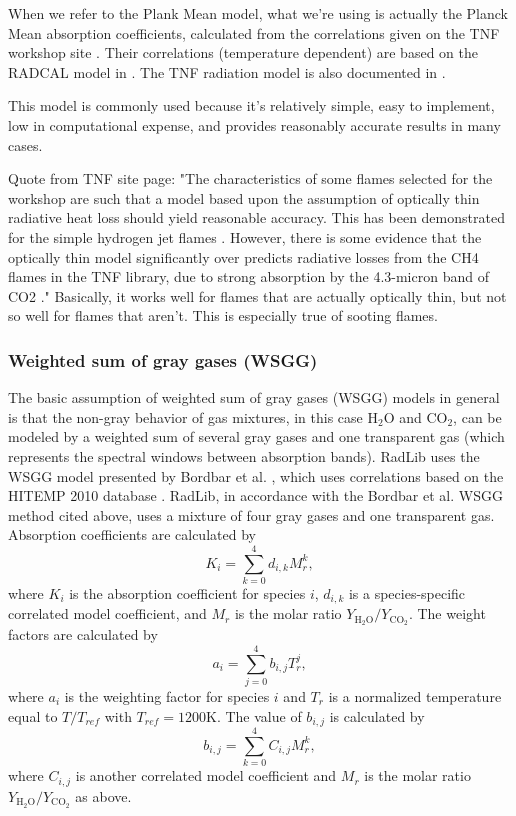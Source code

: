 \documentclass[preprint,12pt, a4paper]{elsarticle}
\begin{document}
When we refer to the Plank Mean model, what we're using is actually the Planck Mean absorption coefficients, calculated from the correlations given on the TNF workshop site \citep{Smith_2003}. Their correlations (temperature dependent) are based on the RADCAL model in \citep{Grosshandler_1993}. The TNF radiation model is also documented in \citep{Barlow_2001}.

This model is commonly used because it's relatively simple, easy to implement, low in computational expense, and provides reasonably accurate results in many cases. 

Quote from TNF site page: "The characteristics of some flames selected for the workshop are such that a model based upon the assumption of optically thin radiative heat loss should yield reasonable accuracy. This has been demonstrated for the simple hydrogen jet flames \cite{Barlow_1999}. However, there is some evidence that the optically thin model significantly over predicts radiative losses from the CH4 flames in the TNF library, due to strong absorption by the 4.3-micron band of CO2 \cite{Frank_2000,Zhu_2002,Coelho_2002}." Basically, it works well for flames that are actually optically thin, but not so well for flames that aren't. This is especially true of sooting flames. 

\subsubsection{Weighted sum of gray gases (WSGG)}
\label{s:wsgg}
The basic assumption of weighted sum of gray gases (WSGG) models in general is that the non-gray behavior of gas mixtures, in this case H$_2$O and CO$_2$, can be modeled by a weighted sum of several gray gases and one transparent gas (which represents the spectral windows between absorption bands). 
RadLib uses the WSGG model presented by Bordbar et al. \citep{Bordbar_2014,Bordbar_2020}, which uses correlations based on the HITEMP 2010 database \cite{Rothman_2010}. RadLib, in accordance with the Bordbar et al. WSGG method cited above, uses a mixture of four gray gases and one transparent gas. Absorption coefficients are calculated by 
\begin{equation}
	K_i=\sum_{k=0}^{4}d_{i,k}M_r^k,
\end{equation}
where $K_i$ is the absorption coefficient for species $i$, $d_{i,k}$ is a species-specific correlated model coefficient, and $M_r$ is the molar ratio $Y_{\mathrm{H_2O}}/Y_{\mathrm{CO_2}}$. The weight factors are calculated by 
\begin{equation}
	a_i=\sum_{j=0}^{4}b_{i,j}T_r^j,
\end{equation}
where $a_i$ is the weighting factor for species $i$ and $T_r$ is a normalized temperature equal to $T/T_{ref}$ with $T_{ref}=1200$K. The value of $b_{i,j}$ is calculated by 
\begin{equation}
	b_{i,j}=\sum_{k=0}^{4}C_{i,j}M_r^k,
\end{equation}
where $C_{i,j}$ is another correlated model coefficient and $M_r$ is the molar ratio $Y_{\mathrm{H_2O}}/Y_{\mathrm{CO_2}}$ as above. 
\end{document}
